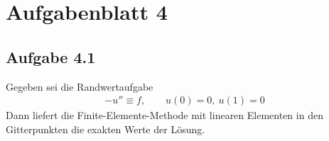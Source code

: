 
\section{Aufgabenblatt 4}
\subsection{Aufgabe 4.1}
Gegeben sei die Randwertaufgabe
\begin{align*}
	-u''\equiv f,\qquad u(0)=0,~u(1)=0
\end{align*}
Dann liefert die Finite-Elemente-Methode mit linearen Elementen in den Gitterpunkten die exakten Werte der Lösung.

